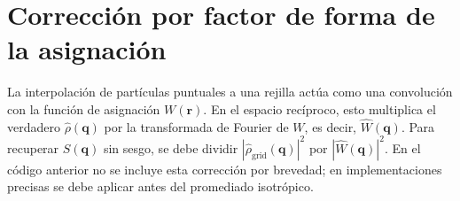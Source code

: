 \documentclass[justified, notoc]{tufte-handout}
\begin{document}
\section{Corrección por factor de forma de la asignación}\label{sec:correccion}

La interpolación de partículas puntuales a una rejilla actúa como una convolución con la función de asignación $W(\mathbf{r})$. En el espacio recíproco, esto multiplica el verdadero $\hat{\rho}(\mathbf{q})$ por la transformada de Fourier de $W$, es decir, $\hat{W}(\mathbf{q})$. Para recuperar $S(\mathbf{q})$ sin sesgo, se debe dividir $|\hat{\rho}_{\text{grid}}(\mathbf{q})|^2$ por $|\hat{W}(\mathbf{q})|^2$.
En el código anterior no se incluye esta corrección por brevedad; en implementaciones precisas se debe aplicar antes del promediado isotrópico.
\end{document}
